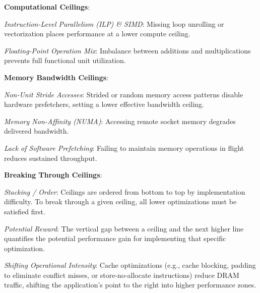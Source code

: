 \begin{dashlist}
    \item \textbf{Computational Ceilings}:
    \begin{dashlist}
        \item \textit{Instruction-Level Parallelism (ILP) \& SIMD}: Missing loop unrolling or vectorization places performance at a lower compute ceiling.
        \item \textit{Floating-Point Operation Mix}: Imbalance between additions and multiplications prevents full functional unit utilization.
    \end{dashlist}
    \item \textbf{Memory Bandwidth Ceilings}:
    \begin{dashlist}
        \item \textit{Non-Unit Stride Accesses}: Strided or random memory access patterns disable hardware prefetchers, setting a lower effective bandwidth ceiling.
        \item \textit{Memory Non-Affinity (NUMA)}: Accessing remote socket memory degrades delivered bandwidth.
        \item \textit{Lack of Software Prefetching}: Failing to maintain memory operations in flight reduces sustained throughput.
    \end{dashlist}
    \item \textbf{Breaking Through Ceilings}:
    \begin{dashlist}
        \item \textit{Stacking / Order}: Ceilings are ordered from bottom to top by implementation difficulty. To break through a given ceiling, all lower optimizations must be satisfied first.
        \item \textit{Potential Reward}: The vertical gap between a ceiling and the next higher line quantifies the potential performance gain for implementing that specific optimization.
        \item \textit{Shifting Operational Intensity}: Cache optimizations (e.g., cache blocking, padding to eliminate conflict misses, or store-no-allocate instructions) reduce DRAM traffic, shifting the application's point to the right into higher performance zones.
    \end{dashlist}
\end{dashlist}



